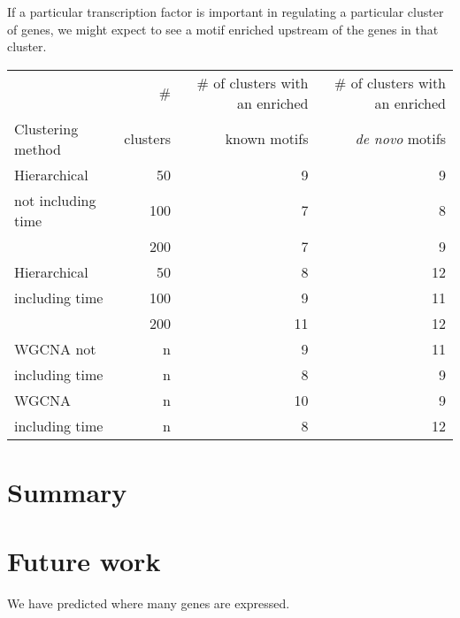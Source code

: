 \documentclass{article}
\begin{document}
If a particular transcription factor is important in regulating
a particular cluster of genes, we might expect to see a motif
enriched upstream of the genes in that cluster.







\begin{center}
\begin{tabular}{lr|rr}
\hline
                 & \# & \# of clusters with an enriched & \# of clusters with an enriched \\
Clustering method & clusters & known motifs & {\em de novo} motifs \\
\hline
Hierarchical & 50 & 9 & 9 \\
not including time & 100 & 7 & 8 \\
            & 200 & 7 & 9 \\
\hline
Hierarchical & 50 & 8 & 12 \\
including time & 100 & 9 & 11 \\
  & 200 & 11 & 12 \\
\hline
WGCNA not & n & 9 & 11 \\
including time & n & 8 & 9 \\
\hline
WGCNA & n & 10 & 9 \\
including time & n & 8 & 12 \\
\hline
\end{tabular}
\end{center}

\section*{Summary}





\section*{Future work}

We have predicted where many genes are expressed.
\end{document}
